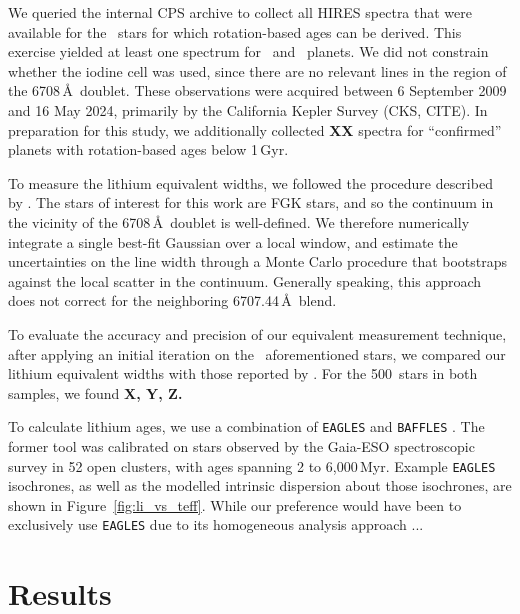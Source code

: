 \documentclass[11pt,twocolumn,tighten]{aastex63}
\newcommand{\nbergeroverlap}{{500}}
\begin{document}
We queried the internal CPS archive to collect all HIRES spectra that
were available for the \nplhoststarwgyroagewithgrazingandhighruwe\
stars for which rotation-based ages can be derived.
This exercise yielded at least one spectrum for \nlithiumstars\ and 
\nlithiumplanets\ planets.
We did not constrain whether the iodine cell was used, since
there are no relevant lines in the region of the 
 6708\,\AA\ doublet.
These observations were acquired between 6 September 2009 and 16
May 2024, primarily by the California Kepler Survey (CKS,
CITE).
In preparation for this study, we additionally collected {\bf XX}
spectra for ``confirmed'' planets with rotation-based ages below
1\,Gyr.

To measure the lithium equivalent widths, we followed the procedure
described by \citet{Bouma_2021}.
The stars of interest for this work are FGK stars, and so the
continuum in the vicinity of the
 6708\,\AA\ doublet is well-defined.
We therefore numerically integrate a single best-fit Gaussian over a
local window, and estimate the uncertainties on the line width through
a Monte Carlo procedure that bootstraps against the local scatter in the
continuum.
Generally speaking, this approach does not correct for the neighboring
\ion{Fe}{1} 6707.44\,\AA\ blend.

To evaluate the accuracy and precision of our equivalent measurement
technique, after applying an initial iteration on the
\nplhoststarwgyroagewithgrazingandhighruwe\ aforementioned stars,
we compared our lithium equivalent widths
with those reported by \citet{Berger_2018}.
For the \nbergeroverlap\ stars in both samples, we found {\bf X, Y,
Z.}

To calculate lithium ages, we use a combination of \texttt{EAGLES}
\citep{Jeffries_2023} and \texttt{BAFFLES}
\citep{Stanford-Moore_2020}.
The former tool was calibrated on stars observed by the Gaia-ESO
spectroscopic survey in 52 open clusters, with ages spanning 2 to
6{,}000\,Myr.  
Example \texttt{EAGLES} isochrones, as well as the modelled intrinsic dispersion
about those isochrones, are shown in Figure~\ref{fig:li_vs_teff}.
While our preference would have been to exclusively use
\texttt{EAGLES} due to its homogeneous analysis approach ...




\section{Results}
\label{sec:results}
\end{document}
